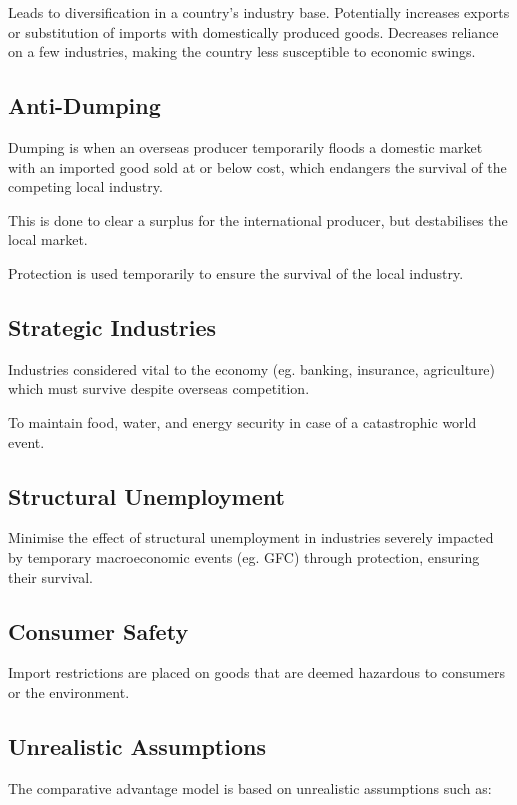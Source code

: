 \documentclass[a4paper,11pt]{report}
\begin{document}
Leads to diversification in a country's industry base. Potentially increases
exports or substitution of imports with domestically produced goods. Decreases
reliance on a few industries, making the country less susceptible to economic
swings.

\subsection{Anti-Dumping}

Dumping is when an overseas producer temporarily floods a domestic market with
an imported good sold at or below cost, which endangers the survival of the
competing local industry.

This is done to clear a surplus for the international producer, but destabilises
the local market.

Protection is used temporarily to ensure the survival of the local industry.

\subsection{Strategic Industries}

Industries considered vital to the economy (eg. banking, insurance, agriculture)
which must survive despite overseas competition.

To maintain food, water, and energy security in case of a catastrophic world
event.

\subsection{Structural Unemployment}

Minimise the effect of structural unemployment in industries severely impacted
by temporary macroeconomic events (eg. GFC) through protection, ensuring their
survival.

\subsection{Consumer Safety}

Import restrictions are placed on goods that are deemed hazardous to consumers
or the environment.

\subsection{Unrealistic Assumptions}

The comparative advantage model is based on unrealistic assumptions such as:
\end{document}
